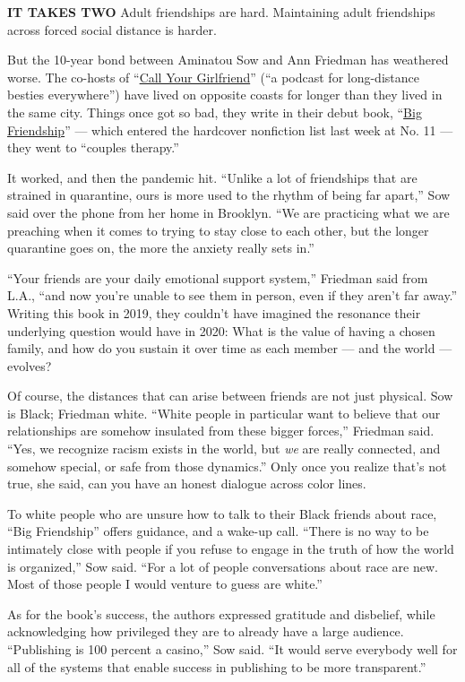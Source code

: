 \textbf{IT TAKES TWO} Adult friendships are hard. Maintaining adult
friendships across forced social distance is harder.

But the 10-year bond between Aminatou Sow and Ann Friedman has weathered
worse. The co-hosts of ``\href{https://www.callyourgirlfriend.com/}{Call
Your Girlfriend}'' (``a podcast for long-distance besties everywhere'')
have lived on opposite coasts for longer than they lived in the same
city. Things once got so bad, they write in their debut book,
``\href{https://www.nytimes.com/2020/07/10/books/review/big-friendship-aminatou-sow-ann-friedman.html}{Big
Friendship}'' --- which entered the hardcover nonfiction list last week
at No. 11 --- they went to ``couples therapy.''

It worked, and then the pandemic hit. ``Unlike a lot of friendships that
are strained in quarantine, ours is more used to the rhythm of being far
apart,'' Sow said over the phone from her home in Brooklyn. ``We are
practicing what we are preaching when it comes to trying to stay close
to each other, but the longer quarantine goes on, the more the anxiety
really sets in.''

``Your friends are your daily emotional support system,'' Friedman said
from L.A., ``and now you're unable to see them in person, even if they
aren't far away.'' Writing this book in 2019, they couldn't have
imagined the resonance their underlying question would have in 2020:
What is the value of having a chosen family, and how do you sustain it
over time as each member --- and the world --- evolves?

Of course, the distances that can arise between friends are not just
physical. Sow is Black; Friedman white. ``White people in particular
want to believe that our relationships are somehow insulated from these
bigger forces,'' Friedman said. ``Yes, we recognize racism exists in the
world, but \emph{we} are really connected, and somehow special, or safe
from those dynamics.'' Only once you realize that's not true, she said,
can you have an honest dialogue across color lines.

To white people who are unsure how to talk to their Black friends about
race, ``Big Friendship'' offers guidance, and a wake-up call. ``There is
no way to be intimately close with people if you refuse to engage in the
truth of how the world is organized,'' Sow said. ``For a lot of people
conversations about race are new. Most of those people I would venture
to guess are white.''

As for the book's success, the authors expressed gratitude and
disbelief, while acknowledging how privileged they are to already have a
large audience. ``Publishing is 100 percent a casino,'' Sow said. ``It
would serve everybody well for all of the systems that enable success in
publishing to be more transparent.''

